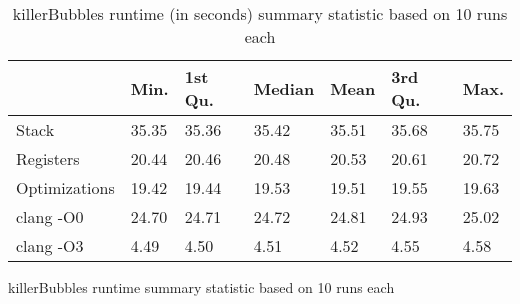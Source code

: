 \begin{table}[h!]
\centering
\begin{tabular}{p{}p{}p{}p{}p{}p{}p{}}
  \hline
 & Min. & 1st Qu. & Median & Mean & 3rd Qu. & Max. \\ 
  \hline
Stack & 35.35 & 35.36 & 35.42 & 35.51 & 35.68 & 35.75 \\ 
  Registers & 20.44 & 20.46 & 20.48 & 20.53 & 20.61 & 20.72 \\ 
  Optimizations & 19.42 & 19.44 & 19.53 & 19.51 & 19.55 & 19.63 \\ 
  clang -O0 & 24.70 & 24.71 & 24.72 & 24.81 & 24.93 & 25.02 \\ 
  clang -O3 & 4.49 & 4.50 & 4.51 & 4.52 & 4.55 & 4.58 \\ 
   \hline
\end{tabular}
\caption{killerBubbles runtime summary statistic based on 10 runs each}
\caption{killerBubbles runtime (in seconds) summary statistic based on 10 runs each}
\end{table}
